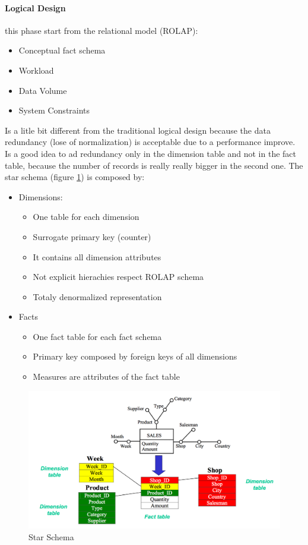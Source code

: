 \documentclass[12pt]{article}
\begin{document}
\paragraph{Logical Design} this phase start from the relational model (ROLAP):
\begin{itemize}
  \item Conceptual fact schema
  \item Workload
  \item Data Volume
  \item System Constraints
\end{itemize}
Is a litle bit different from the traditional logical design because the data redundancy (lose of normalization) is acceptable due to a performance improve. Is a good idea to ad redundancy only in the dimension table and not in the fact table, because the number of records is really really bigger in the second one.
The star schema (figure \ref{fig:bigstar}) is composed by:
\begin{itemize}
  \item Dimensions:
  \begin{itemize}
    \item One table for each dimension
    \item Surrogate primary key (counter)
    \item It contains all dimension attributes
    \item Not explicit hierachies respect ROLAP schema
    \item Totaly denormalized representation
  \end{itemize}
  \item Facts
  \begin{itemize}
    \item One fact table for each fact schema
    \item Primary key composed by foreign keys of all dimensions
    \item Measures are attributes of the fact table
  \end{itemize}
\end{itemize}

\begin{figure}[h!]
  \includegraphics[width=\linewidth]{images/bigstar.png}
  \caption{Star Schema}
  \label{fig:bigstar}
\end{figure}
\end{document}
